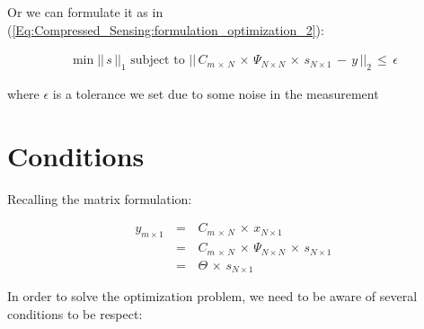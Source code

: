 \documentclass[12pt,a4paper]{book}
\begin{document}
\begin{itemize}
\begin{itemize}
Or we can formulate it as in (\ref{Eq:Compressed_Sensing:formulation_optimization_2}):

\begin{equation}
\begin{array}{rcl}
\min ||\, s \, ||_1 \text{ subject to }  || \, C_{m \, \times \, N} \, \times \, \Psi_{N \times N} \, \times \, s_{N \times 1} \, - \, y \, ||_2 \, \leq \, \epsilon
\end{array}
\label{Eq:Compressed_Sensing:formulation_optimization_2}
\end{equation}	

where $\epsilon$ is a tolerance we set due to some noise in the measurement
		
	\end{itemize}


 

\end{itemize}

\section{Conditions}

Recalling the matrix formulation:

	\begin{equation}
	\begin{array}{rcl}
	y_{m \times 1} \, &=& \, C_{m \, \times \, N} \,\times \,  x_{N \times 1} \\ 
		 &=& \, C_{m \, \times \, N} \, \times \, \Psi_{N \times N} \, \times \, s_{N \times 1} \\
		 &=& \, \Theta \, \times \, s_{N \times 1}

	\end{array}
	\label{Eq:Compressed_Sensing:formulation_2_recall}
	\end{equation}

In order to solve the optimization problem, we need to be aware of several conditions to be respect:
\end{document}
